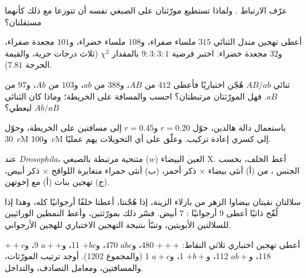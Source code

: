 \begin{exercise}[$\star$]\label{exo:b2:meiosis-heredity:4}
عرّف الارتباط  . ولماذا تستطيع
مورّثتان على الصبغي نفسه أن تتوزعا مع ذلك كأنهما مستقلتان؟
\end{exercise}

\begin{exercise}[$\star\star$]\label{exo:b2:meiosis-heredity:5}
أعطى تهجين مندل الثنائي $315$ ملساء صفراء، و$108$ ملساء خضراء،
و$101$ مجعدة صفراء، و$32$ مجعدة خضراء. اختبر فرضية $9 : 3 : 3 :
1$ بالمقدار $\chi^2$ (ثلاث درجات حرية، والقيمة الحرجة
$7.81$).
\end{exercise}

\begin{exercise}[$\star\star$]\label{exo:b2:meiosis-heredity:6}
ثنائي $AB/ab$ هُجّن اختباريًا فأعطى $412$ من $AB$، و$388$ من $ab$، و$103$
من $Ab$، و$97$ من $aB$. فهل المورّثتان مرتبطتان؟ احسب  والمسافة على الخريطة؛ وماذا كان الثنائي $Ab/aB$ ليعطي؟
\end{exercise}

\begin{exercise}[$\star\star$]\label{exo:b2:meiosis-heredity:7}
باستعمال دالة هالدين، حوّل $r = 0.20$ و$r = 0.45$ إلى مسافتين على
الخريطة، وحوّل \qty{30}{cM} و\qty{100}{cM} إلى كسري إعادة تركيب.
وعلّق على أي التحويلات يهم عمليًا.
\end{exercise}

\begin{exercise}[$\star\star$]\label{exo:b2:meiosis-heredity:8}
عند \emph{Drosophila}، العين البيضاء ($w$) متنحية مرتبطة بالصبغي X.
أعط الخلف، بحسب الجنس ، من (أ) أنثى بيضاء $\times$
ذكر أحمر، (ب) أنثى حمراء متغايرة اللواقح $\times$ ذكر أبيض، (ج)
تهجين بنات (أ) مع إخوتهن.
\end{exercise}

\begin{exercise}[$\star\star$]\label{exo:b2:meiosis-heredity:9}
سلالتان نقيتان بيضاوا الزهر من بازلاء الزينة، إذا هُجّنتا، أعطتا
خلفًا أرجوانيًا كله، وهذا إذا لُقّح ذاتيًا أعطى $9$ أرجوانيًا :
$7$ أبيض. فسّر ذلك بمورّثتين، وأعط النمطين الوراثيين للسلالتين
الأبويتين، وتنبّأ بنتيجة التهجين الاختباري للهجين الأرجواني.
\end{exercise}

\begin{exercise}[$\star\star\star$]\label{exo:b2:meiosis-heredity:10}
أعطى تهجين اختباري ثلاثي النقاط: $+++$ 480، و$abc$ 470، و$+bc$ 11،
و$a++$ 9، و$++c$ 118، و$ab+$ 112، و$+b+$ 1، و$a+c$ 1 (والمجموع 1202).
أوجد ترتيب المورّثات، والمسافتين، ومعامل التصادف، والتداخل.
\end{exercise}

